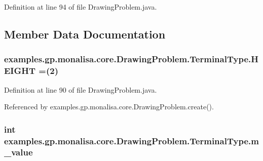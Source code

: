 Definition at line 94 of file Drawing\-Problem.\-java.



\subsection{Member Data Documentation}
\hypertarget{enumexamples_1_1gp_1_1monalisa_1_1core_1_1_drawing_problem_1_1_terminal_type_a72ed33e53f1ec9a913ba18cfc7e3e17f}{
\subsubsection[{H\-E\-I\-G\-H\-T}]{\setlength{\rightskip}{0pt plus 5cm}examples.\-gp.\-monalisa.\-core.\-Drawing\-Problem.\-Terminal\-Type.\-H\-E\-I\-G\-H\-T =(2)}}\label{enumexamples_1_1gp_1_1monalisa_1_1core_1_1_drawing_problem_1_1_terminal_type_a72ed33e53f1ec9a913ba18cfc7e3e17f}


Definition at line 90 of file Drawing\-Problem.\-java.



Referenced by examples.\-gp.\-monalisa.\-core.\-Drawing\-Problem.\-create().

\hypertarget{enumexamples_1_1gp_1_1monalisa_1_1core_1_1_drawing_problem_1_1_terminal_type_a600abf62852998bcbb4bee93eee9f68e}{
\subsubsection[{m\-\_\-value}]{\setlength{\rightskip}{0pt plus 5cm}int examples.\-gp.\-monalisa.\-core.\-Drawing\-Problem.\-Terminal\-Type.\-m\-\_\-value\hspace{0.3cm}{\ttfamily [private]}}}\label{enumexamples_1_1gp_1_1monalisa_1_1core_1_1_drawing_problem_1_1_terminal_type_a600abf62852998bcbb4bee93eee9f68e}


